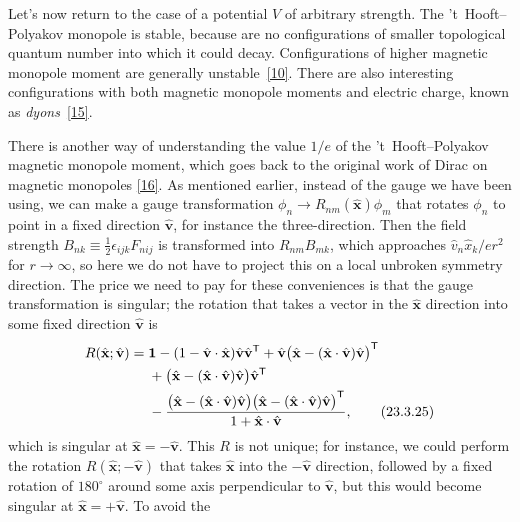 Let's now return to the case of a potential $V$ of arbitrary strength. The
't~Hooft--Polyakov monopole is stable, because are no configurations of
smaller topological quantum number into which it could decay.
Configurations of higher magnetic monopole moment are generally
unstable~\hyperref[ch23-ref-10]{[10]}. There are also interesting
configurations with both magnetic monopole moments and electric charge,
known as \emph{dyons}~\hyperref[ch23-ref-15]{[15]}.

There is another way of understanding the value $1/e$ of the
't~Hooft--Polyakov magnetic monopole moment, which goes back to the
original work of Dirac on magnetic monopoles \hyperref[ch23-ref-16]{[16]}.
As mentioned earlier, instead of the gauge we have been using, we can make
a gauge transformation
$\phi_n\to R_{nm}(\hat{\mathbf x})\phi_m$ that rotates $\phi_n$ to point
in a fixed direction $\hat{\mathbf v}$, for instance the three-direction.
Then the field strength
$B_{nk}\equiv\frac12\epsilon_{ijk}F_{nij}$ is transformed into
$R_{nm}B_{mk}$, which approaches
$\hat v_n\hat x_k/er^2$ for $r\to\infty$, so here we do not have to
project this on a local unbroken symmetry direction. The price we need to
pay for these conveniences is that the gauge transformation is singular;
the rotation that takes a vector in the $\hat{\mathbf x}$ direction into
some fixed direction $\hat{\mathbf v}$ is
\begin{align}
 R(\hat{\mathbf x};\hat{\mathbf v})={}&
 \mathbf{1}-(1-\hat{\mathbf v}\cdot\hat{\mathbf x})
 \hat{\mathbf v}\hat{\mathbf v}^{\mathsf T}
 +\hat{\mathbf v}
 \bigl(\hat{\mathbf x}-(\hat{\mathbf x}\cdot\hat{\mathbf v})
 \hat{\mathbf v}\bigr)^{\mathsf T}
 \notag\\
 &+\bigl(\hat{\mathbf x}-(\hat{\mathbf x}\cdot\hat{\mathbf v})
 \hat{\mathbf v}\bigr)\hat{\mathbf v}^{\mathsf T}
 \notag\\
 &-\frac{
 \bigl(\hat{\mathbf x}-(\hat{\mathbf x}\cdot\hat{\mathbf v})
 \hat{\mathbf v}\bigr)
 \bigl(\hat{\mathbf x}-(\hat{\mathbf x}\cdot\hat{\mathbf v})
 \hat{\mathbf v}\bigr)^{\mathsf T}}
 {1+\hat{\mathbf x}\cdot\hat{\mathbf v}},
 \tag{23.3.25}\label{eq:23.3.25}
\end{align}
which is singular at $\hat{\mathbf x}=-\hat{\mathbf v}$. This $R$ is not
unique; for instance, we could perform the rotation
$R(\hat{\mathbf x};-\hat{\mathbf v})$ that takes $\hat{\mathbf x}$ into
the $-\hat{\mathbf v}$ direction, followed by a fixed rotation of
$180^\circ$ around some axis perpendicular to $\hat{\mathbf v}$, but this
would become singular at $\hat{\mathbf x}=+\hat{\mathbf v}$. To avoid the
